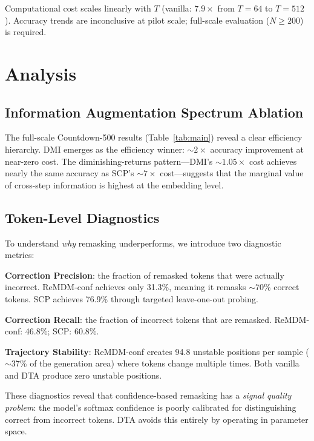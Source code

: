 \documentclass{article}
\begin{document}
Computational cost scales linearly with $T$ (vanilla: $7.9{\times}$ from $T=64$ to $T=512$). Accuracy trends are inconclusive at pilot scale; full-scale evaluation ($N \geq 200$) is required.

\section{Analysis}
\label{sec:analysis}

\subsection{Information Augmentation Spectrum Ablation}
\label{sec:spectrum_ablation}

The full-scale Countdown-500 results (Table~\ref{tab:main}) reveal a clear efficiency hierarchy. DMI emerges as the efficiency winner: ${\sim}2{\times}$ accuracy improvement at near-zero cost. The diminishing-returns pattern---DMI's ${\sim}1.05{\times}$ cost achieves nearly the same accuracy as SCP's ${\sim}7{\times}$ cost---suggests that the marginal value of cross-step information is highest at the embedding level.

\subsection{Token-Level Diagnostics}
\label{sec:diagnostics}

To understand \emph{why} remasking underperforms, we introduce two diagnostic metrics:

\textbf{Correction Precision}: the fraction of remasked tokens that were actually incorrect. ReMDM-conf achieves only 31.3\%, meaning it remasks ${\sim}70$\% correct tokens. SCP achieves 76.9\% through targeted leave-one-out probing.

\textbf{Correction Recall}: the fraction of incorrect tokens that are remasked. ReMDM-conf: 46.8\%; SCP: 60.8\%.

\textbf{Trajectory Stability}: ReMDM-conf creates 94.8 unstable positions per sample (${\sim}37$\% of the generation area) where tokens change multiple times. Both vanilla and DTA produce zero unstable positions.

These diagnostics reveal that confidence-based remasking has a \emph{signal quality problem}: the model's softmax confidence is poorly calibrated for distinguishing correct from incorrect tokens. DTA avoids this entirely by operating in parameter space.
\end{document}
